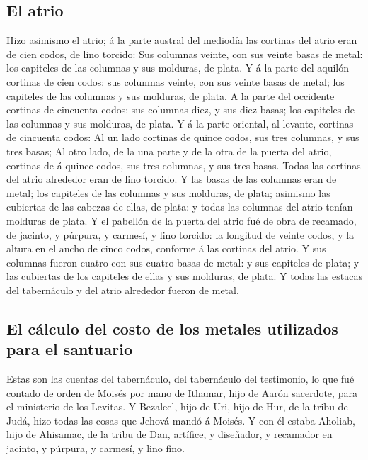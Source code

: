 \hypertarget{el-atrio}{%
\subsection{El atrio}\label{el-atrio}}

 Hizo asimismo el atrio; á la parte austral del mediodía
las cortinas del atrio eran de cien codos, de lino torcido:
 Sus columnas veinte, con sus veinte basas de metal: los
capiteles de las columnas y sus molduras, de plata.  Y á
la parte del aquilón cortinas de cien codos: sus columnas veinte, con
sus veinte basas de metal; los capiteles de las columnas y sus molduras,
de plata.  A la parte del occidente cortinas de cincuenta
codos: sus columnas diez, y sus diez basas; los capiteles de las
columnas y sus molduras, de plata.  Y á la parte
oriental, al levante, cortinas de cincuenta codos:  Al un
lado cortinas de quince codos, sus tres columnas, y sus tres basas;
 Al otro lado, de la una parte y de la otra de la puerta
del atrio, cortinas de á quince codos, sus tres columnas, y sus tres
basas.  Todas las cortinas del atrio alrededor eran de
lino torcido.  Y las basas de las columnas eran de metal;
los capiteles de las columnas y sus molduras, de plata; asimismo las
cubiertas de las cabezas de ellas, de plata: y todas las columnas del
atrio tenían molduras de plata.  Y el pabellón de la
puerta del atrio fué de obra de recamado, de jacinto, y púrpura, y
carmesí, y lino torcido: la longitud de veinte codos, y la altura en el
ancho de cinco codos, conforme á las cortinas del atrio. 
Y sus columnas fueron cuatro con sus cuatro basas de metal: y sus
capiteles de plata; y las cubiertas de los capiteles de ellas y sus
molduras, de plata.  Y todas las estacas del tabernáculo
y del atrio alrededor fueron de metal.

\hypertarget{el-cuxe1lculo-del-costo-de-los-metales-utilizados-para-el-santuario}{%
\subsection{El cálculo del costo de los metales utilizados para el
santuario}\label{el-cuxe1lculo-del-costo-de-los-metales-utilizados-para-el-santuario}}

 Estas son las cuentas del tabernáculo, del tabernáculo
del testimonio, lo que fué contado de orden de Moisés por mano de
Ithamar, hijo de Aarón sacerdote, para el ministerio de los Levitas.
 Y Bezaleel, hijo de Uri, hijo de Hur, de la tribu de
Judá, hizo todas las cosas que Jehová mandó á Moisés.  Y
con él estaba Aholiab, hijo de Ahisamac, de la tribu de Dan, artífice, y
diseñador, y recamador en jacinto, y púrpura, y carmesí, y lino fino.

